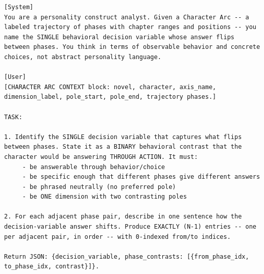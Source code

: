 \documentclass[11pt]{article}
\begin{document}
\begin{table}[htbp]
\centering
\caption{Decision-variable extractor (Stage~i of probe generation).}
\label{tab:prompt-decision-variable}
\begin{lstlisting}[basicstyle=\ttfamily\scriptsize]
[System]
You are a personality construct analyst. Given a Character Arc -- a labeled trajectory of phases with chapter ranges and positions -- you name the SINGLE behavioral decision variable whose answer flips between phases. You think in terms of observable behavior and concrete choices, not abstract personality language.

[User]
[CHARACTER ARC CONTEXT block: novel, character, axis_name, dimension_label, pole_start, pole_end, trajectory phases.]

TASK:

1. Identify the SINGLE decision variable that captures what flips between phases. State it as a BINARY behavioral contrast that the character would be answering THROUGH ACTION. It must:
     - be answerable through behavior/choice
     - be specific enough that different phases give different answers
     - be phrased neutrally (no preferred pole)
     - be ONE dimension with two contrasting poles

2. For each adjacent phase pair, describe in one sentence how the decision-variable answer shifts. Produce EXACTLY (N-1) entries -- one per adjacent pair, in order -- with 0-indexed from/to indices.

Return JSON: {decision_variable, phase_contrasts: [{from_phase_idx, to_phase_idx, contrast}]}.
\end{lstlisting}
\end{table}
\end{document}
